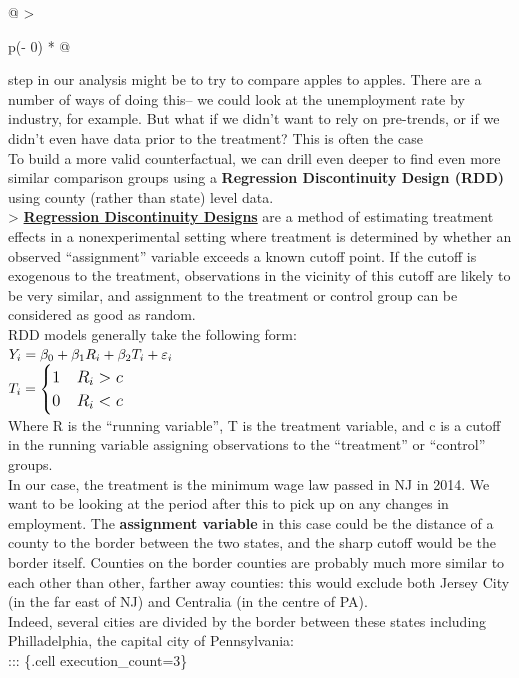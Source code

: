 \documentclass[
  letterpaper,
  DIV=11,
  numbers=noendperiod]{scrreprt}
\begin{document}
\begin{longtable}[]{@{}
  >{\raggedright\arraybackslash}p{}@{}}
step in our analysis might be to try to compare apples to apples. There
are a number of ways of doing this-- we could look at the unemployment
rate by industry, for example. But what if we didn't want to rely on
pre-trends, or if we didn't even have data prior to the treatment? This
is often the case \\
To build a more valid counterfactual, we can drill even deeper to find
even more similar comparison groups using a \textbf{Regression
Discontinuity Design (RDD)} using county (rather than state) level
data. \\
\textgreater{}
\textbf{\href{https://www.princeton.edu/~davidlee/wp/RDDEconomics.pdf}{Regression
Discontinuity Designs}} are a method of estimating treatment effects in
a nonexperimental setting where treatment is determined by whether an
observed ``assignment'' variable exceeds a known cutoff point. If the
cutoff is exogenous to the treatment, observations in the vicinity of
this cutoff are likely to be very similar, and assignment to the
treatment or control group can be considered as good as random. \\
RDD models generally take the following form: \\
\(\huge Y_{i} = \beta_0 + \beta_1 R_i + \beta_2 T_i + \varepsilon_{i}\) \\
\(\large T_i=    \begin{cases}
1 & R_i>c\\
0 & R_i<c\\
\end{cases} \) \\
Where R is the ``running variable'', T is the treatment variable, and c
is a cutoff in the running variable assigning observations to the
``treatment'' or ``control'' groups. \\
In our case, the treatment is the minimum wage law passed in NJ in 2014.
We want to be looking at the period after this to pick up on any changes
in employment. The \textbf{assignment variable} in this case could be
the distance of a county to the border between the two states, and the
sharp cutoff would be the border itself. Counties on the border counties
are probably much more similar to each other than other, farther away
counties: this would exclude both Jersey City (in the far east of NJ)
and Centralia (in the centre of PA). \\
Indeed, several cities are divided by the border between these states
including Philladelphia, the capital city of Pennsylvania: \\
::: \{.cell execution\_count=3\} \\

\end{longtable}
\end{document}
